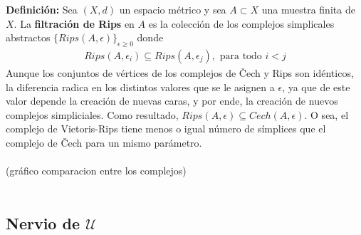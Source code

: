 \documentclass{article}
\begin{document}
\textbf{Definición:} Sea $(X, d)$ un espacio métrico y sea $A \subset X$ una muestra finita de $X$. La \textbf{filtración de Rips} en $A$ es la colección de los complejos simplicales abstractos $\{Rips(A,\epsilon)\}_{\epsilon \geq 0}$ donde
\begin{align*}
    Rips(A,\epsilon_{i}) \subseteq Rips(A,\epsilon_{j}), \text{ para todo } i < j
\end{align*}
Aunque los conjuntos de vértices de los complejos de Čech y Rips son idénticos, la diferencia radica en los distintos valores que se le asignen a $\epsilon$, ya que de este valor depende la creación de nuevas caras, y por ende, la creación de nuevos complejos simpliciales. Como resultado, $Rips(A,\epsilon) \subseteq Cech(A,\epsilon)$. O sea, el complejo de
Vietoris-Rips tiene menos o igual número de símplices que el complejo de Čech para un mismo parámetro.\\
\\
(gráfico comparacion entre los complejos)\\
\\


\subsection{Nervio de $\mathcal{U}$}
\end{document}
